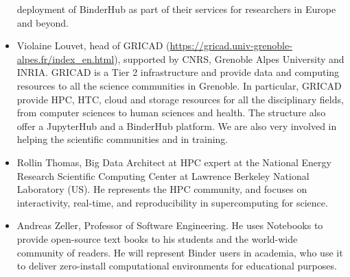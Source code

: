 \begin{itemize}
  deployment of BinderHub as part of their services for researchers in Europe
  and beyond.
\item Violaine Louvet, head of GRICAD (\href{Grenoble Alpe Research -
 Scientific Computing and Data Infrastructure}
 {https://gricad.univ-grenoble-alpes.fr/index_en.html}), supported by
 CNRS, Grenoble Alpes University and INRIA. GRICAD is a Tier 2
 infrastructure and provide data and computing resources to all the
 science communities in Grenoble. In particular, GRICAD provide HPC,
 HTC, cloud and storage resources for all the disciplinary fields,
 from computer sciences to human sciences and health. The structure
 also offer a JupyterHub and a BinderHub platform. We are also very
 involved in helping the scientific communities and in training.
 \item Rollin Thomas, Big Data Architect at HPC expert at the National Energy
  Research Scientific Computing Center at Lawrence Berkeley National Laboratory
  (US). He represents the HPC community, and focuses on interactivity,
  real-time, and reproducibility in supercomputing for science.
\item Andreas Zeller, Professor of Software Engineering. He uses Notebooks 
  to provide open-source text books to his students and the world-wide
  community of readers. He will represent Binder users in academia, who use it 
  to deliver zero-install computational environments for educational
  purposes.
\end{itemize}
